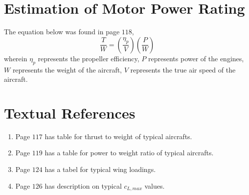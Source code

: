 \documentclass[letter, 12pt]{article}
\begin{document}
\begin{center}
\section{Estimation of Motor Power Rating}
\begin{comment}
\end{comment}
The equation below was found in page $118$,
$$\frac{T}{W} = \left(\frac{\eta_{p}}{V}\right)\left(\frac{P}{W}\right)$$
wherein $\eta_{p}$ represents the propeller efficiency, 
$P$ represents power of the engines, $W$ represents the weight of the aircraft,
$V$ represents the true air speed of the aircraft.

\section{Textual References}
\begin{comment}
\end{comment}
\begin{enumerate}
\item Page $117$ has table for thrust to weight of typical aircrafts.
\item Page $119$ has a table for power to weight ratio of typical aircrafts.
\item Page $124$ has a tabel for typical wing loadings.
\item Page $126$ has description on typical $c_{L,max}$ values.
\end{enumerate}

\begin{comment}
Take-off distance is shown in this equation for a propeller (Page $130$)
$$\frac{W}{S} = T_{op} \sigma c_{L,TO}(hp/W)$$
wherein $T_{op}$ represents
$\sigma$ represents the density ratio. This is basically just the air density $\rho$ at takeoff altitude divided by sea-level density
$c_{L,TO}$ represents the take-off lift coefficient. This is the maximum lift coefficient divided by $1.21 = 1.1^{2}$. This is because the aircraft takes off at around $1.1$ of its stall speed.
$hp$ represents 
$W$ represents take-off weight of the aircraft
\end{comment}


\end{center}
\end{document}
